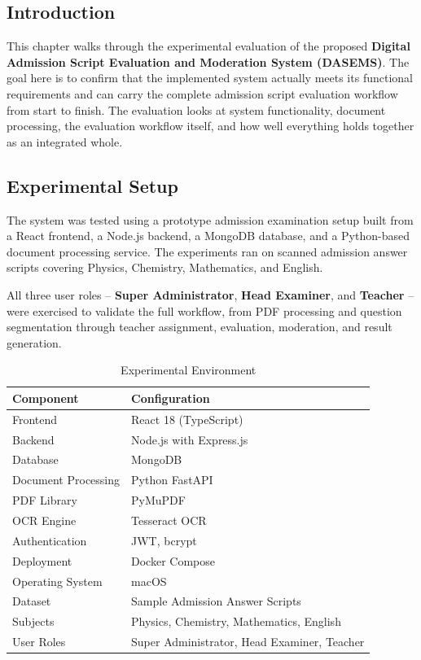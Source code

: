 \vspace{0.5cm}

\subsection{Introduction}

This chapter walks through the experimental evaluation of the proposed \textbf{Digital Admission Script Evaluation and Moderation System (DASEMS)}. The goal here is to confirm that the implemented system actually meets its functional requirements and can carry the complete admission script evaluation workflow from start to finish. The evaluation looks at system functionality, document processing, the evaluation workflow itself, and how well everything holds together as an integrated whole.

\subsection{Experimental Setup}

The system was tested using a prototype admission examination setup built from a React frontend, a Node.js backend, a MongoDB database, and a Python-based document processing service. The experiments ran on scanned admission answer scripts covering Physics, Chemistry, Mathematics, and English.

All three user roles -- \textbf{Super Administrator}, \textbf{Head Examiner}, and \textbf{Teacher} -- were exercised to validate the full workflow, from PDF processing and question segmentation through teacher assignment, evaluation, moderation, and result generation.

\begin{table}[H]
\centering
\caption{Experimental Environment}
\label{tab:experimental_environment}
\renewcommand{\arraystretch}{1.2}

\begin{tabular}{|p{5cm}|p{7.5cm}|}
\hline
\textbf{Component} & \textbf{Configuration} \\
\hline
Frontend & React 18 (TypeScript) \\
\hline
Backend & Node.js with Express.js \\
\hline
Database & MongoDB \\
\hline
Document Processing & Python FastAPI \\
\hline
PDF Library & PyMuPDF \\
\hline
OCR Engine & Tesseract OCR \\
\hline
Authentication & JWT, bcrypt \\
\hline
Deployment & Docker Compose \\
\hline
Operating System & macOS \\
\hline
Dataset & Sample Admission Answer Scripts \\
\hline
Subjects & Physics, Chemistry, Mathematics, English \\
\hline
User Roles & Super Administrator, Head Examiner, Teacher \\
\hline
\end{tabular}

\end{table}

